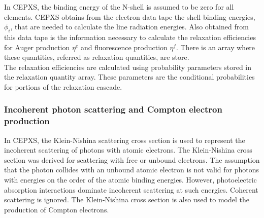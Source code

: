 In CEPXS, the binding energy of the N-shell is assumed to be zero for all
elements. CEPXS obtains from the electron data tape the shell binding
energies, $\phi_i$, that are needed to calculate the line radiation energies.
Also obtained from this data tape is the information necessary to calculate
the relaxation efficiencies for Auger production $\eta^e$ and fluorescence
production $\eta^f$. There is an array where these quantities, referred as
relaxation quantities, are store.\\
The relaxation efficiencies are calculated using probability parameters stored
in the relaxation quantity array. These parameters are the conditional
probabilities for portions of the relaxation cascade.

\subsubsection{Incoherent photon scattering and Compton electron production}
In CEPXS, the Klein-Nishina scattering cross section is used to represent the
incoherent scattering of photons with atomic electrons. The Klein-Nishina
cross  section was derived for scattering with free or unbound electrons. The
assumption that the photon collides with an unbound atomic electron is not valid for
photons with energies on the order of the atomic binding energies. However,
photoelectric absorption interactions dominate incoherent scattering at such
energies. Coherent scattering is ignored. The Klein-Nishina cross section is
also used to model the production of Compton electrons.

